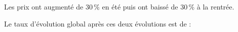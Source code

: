 
Les prix ont augmenté de $30\,\%$ en été puis ont baissé de $30\,\%$ à la rentrée.

Le taux d'évolution global après ces deux évolutions est de :

\smallskip

